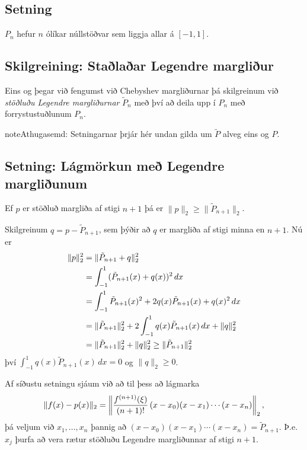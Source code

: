 \documentclass[letterpaper,10pt,icelandic]{sphinxmanual}
\begin{document}
\subsection{Setning}
\label{kafli03:id6}
\(P_n\) hefur \(n\) ólíkar núllstöðvar sem liggja
allar á \([-1,1]\).


\subsection{Skilgreining: Staðlaðar Legendre margliður}
\label{kafli03:skilgreining-stalaar-legendre-margliur}
Eins og þegar við fengumst við Chebyshev margliðurnar þá skilgreinum við
\emph{stöðluðu Legendre margliðurnar} \(\tilde P_n\) með því að deila upp
í \(P_n\) með forrystustuðlunum \(P_n\).

\begin{notice}{note}{Athugasemd:}
Setningarnar þrjár hér undan gilda um \(\tilde P\) alveg eins og \(P\).
\end{notice}


\subsection{Setning: Lágmörkun með Legendre margliðunum}
\label{kafli03:setning-lagmorkun-me-legendre-margliunum}
Ef \(p\) er stöðluð margliða af stigi \(n+1\) þá er
\(\|p\|_2\geq \|\tilde P_{n+1}\|_2\).

Skilgreinum
\(q = p-\tilde P_{n+1}\), sem þýðir að \(q\) er margliða af
stigi minna en \(n+1\). Nú er
\begin{gather}
\begin{split}\begin{aligned}
   \|p\|_2^2 &= \|\tilde P_{n+1} + q\|_2^2 \\
   &= \int_{-1}^1 (\tilde P_{n+1}(x) + q(x))^2\, dx \\
   &= \int_{-1}^1 \tilde P_{n+1}(x)^2 + 2q(x)\tilde P_{n+1}(x) + q(x)^2\, dx\\
   &= \|\tilde P_{n+1}\|_2^2 + 2\int_{-1}^1 q(x)\tilde P_{n+1}(x)\, dx + \|q\|_2^2\\
   &= \|\tilde P_{n+1}\|_2^2 +  \|q\|_2^2 \geq \|\tilde P_{n+1}\|_2^2
  \end{aligned}\end{split}\notag
\end{gather}
því \(\int_{-1}^1 q(x)\tilde P_{n+1}(x)\, dx=0\) og
\(\|q\|_2 \geq 0\).

Af síðustu setningu sjáum við að til þess að lágmarka
\begin{gather}
\begin{split}\|f(x)-p(x)\|_2 = \left\|\frac{f^{(n+1)}(\xi)}{(n+1)!}\, (x-x_0)(x-x_1)\cdots (x-x_n) \right\|_2,\end{split}\notag
\end{gather}
þá veljum við \(x_1,\ldots,x_n\) þannig að
\((x-x_0)(x-x_1)\cdots (x-x_n) = \tilde P_{n+1}\).
Þ.e. \(x_j\) þurfa að vera rætur stöðluðu Legendre margliðunnar af
stigi \(n+1\).
\end{document}
